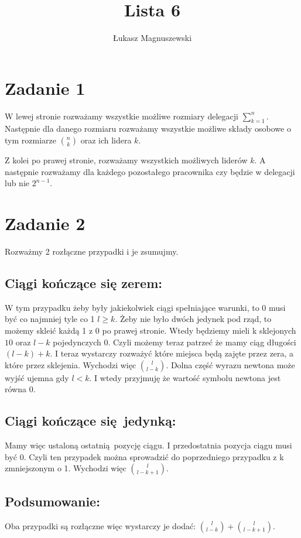\documentclass{article}
\title{Lista 6}
\author{Łukasz Magnuszewski}
\date{\vspace{-5ex}}
\begin{document}
\maketitle

\section*{Zadanie 1}

W lewej stronie rozważamy wszystkie możliwe rozmiary delegacji $\sum^n_{k=1}$. Następnie dla danego rozmiaru rozważamy wszystkie możliwe składy osobowe o tym rozmiarze ${n \choose k} $ oraz ich lidera $k$. 

Z kolei po prawej stronie, rozważamy wszystkich możliwych liderów $k$. A następnie rozważamy dla każdego pozostałego pracownika czy będzie w delegacji lub nie $2^{n-1}$.

\section*{Zadanie 2}
Rozważmy 2 rozłączne przypadki i je zsumujmy. 

\subsection*{Ciągi kończące się zerem:}
W tym przypadku żeby były jakiekolwiek ciągi spełniające warunki, to 0 musi być co najmniej tyle co 1 $l \geq k$.
Żeby nie było dwóch jedynek pod rząd, to możemy skleić każdą 1 z 0 po prawej stronie. Wtedy będziemy mieli k sklejonych $1 0$ oraz $l-k$ pojedynczych $0$. Czyli możemy teraz patrzeć że mamy ciąg długości $(l-k) + k$. I teraz wystarczy rozważyć które miejsca będą zajęte przez zera, a które przez sklejenia. Wychodzi więc $ {l \choose l -k}$. Dolna część wyrazu newtona może wyjść ujemna gdy $l < k$. I wtedy przyjmuję że wartość symbolu newtona jest równa 0.

\subsection*{Ciągi kończące się jedynką:}
    Mamy więc ustaloną ostatnią pozycję ciągu. I przedostatnia pozycja ciągu musi być 0. Czyli ten przypadek można sprowadzić do poprzedniego przypadku z k zmniejszonym o 1. Wychodzi więc ${l \choose l-k+1}$.

\subsection*{Podsumowanie:}
Oba przypadki są rozłączne więc wystarczy je dodać:
$ {l \choose l -k} + {l \choose l-k+1}$.
\end{document}
